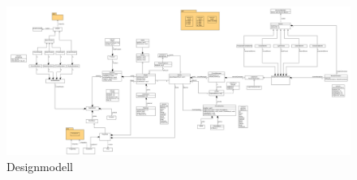 \documentclass{article}
\newcommand{\listofcode}{
  \doublespacing
  \listof{Code}{Quelltextverzeichnis}
}
\begin{document}
\listoffigures

\newpage

\begin{figure} [ht]
  \centering
  \includegraphics[angle=90,width=.65\linewidth]{design_full.png}
  \caption{Designmodell}
  \label{pic:design}
\end{figure}

\end{document}
